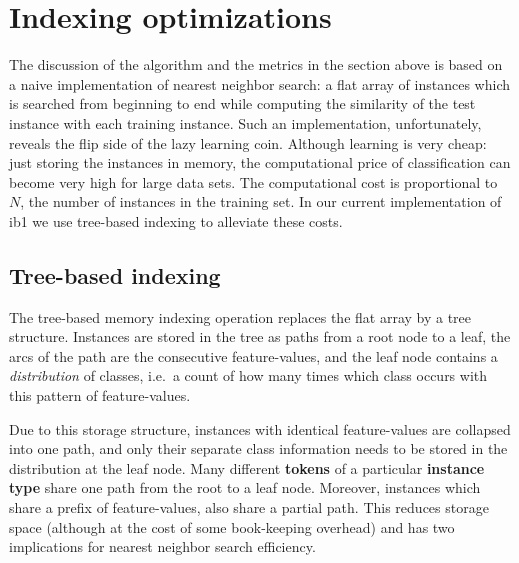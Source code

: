\documentclass{report}
\begin{document}
\section{Indexing optimizations}
\label{indexing}

The discussion of the algorithm and the metrics in the section above
is based on a naive implementation of nearest neighbor search: a flat
array of instances which is searched from beginning to end while
computing the similarity of the test instance with each training
instance. Such an implementation, unfortunately, reveals the flip side
of the lazy learning coin. Although learning is very cheap: just
storing the instances in memory, the computational price of
classification can become very high for large data sets. The
computational cost is proportional to $N$, the number of instances in
the training set. In our current implementation of {\sc ib1} we use
tree-based indexing to alleviate these costs.

\subsection{Tree-based indexing}

The tree-based memory indexing operation replaces the flat array
by a tree structure. Instances are stored in the tree as
paths from a root node to a leaf, the arcs of the path are the
consecutive feature-values, and the leaf node contains a {\em
distribution} of classes, i.e.~a count of how many times which class
occurs with this pattern of feature-values. %

Due to this storage structure, instances with identical feature-values
are collapsed into one path, and only their separate class
information needs to be stored in the distribution at the leaf
node. Many different {\bf tokens} of a particular {\bf instance type}
share one path from the root to a leaf node. Moreover, instances which
share a prefix of feature-values, also share a partial path. This
reduces storage space (although at the cost of some book-keeping
overhead) and has two implications for nearest neighbor search
efficiency.


\end{document}
